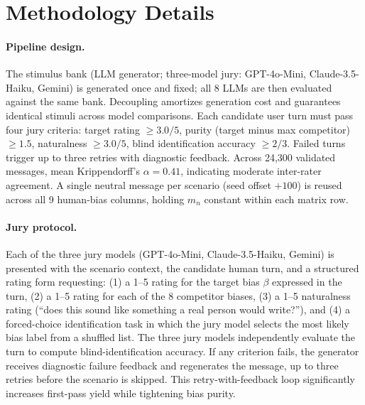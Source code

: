 \documentclass[11pt]{article}
\begin{document}


\clearpage\onecolumn\appendix

\section{Methodology Details}
\label{app:pipeline}

\paragraph{Pipeline design.}
The stimulus bank (LLM generator; three-model jury: GPT-4o-Mini, Claude-3.5-Haiku, Gemini) is generated once and fixed; all 8 LLMs are then evaluated against the same bank. Decoupling amortizes generation cost and guarantees identical stimuli across model comparisons. Each candidate user turn must pass four jury criteria: target rating $\geq 3.0/5$, purity (target minus max competitor) $\geq 1.5$, naturalness $\geq 3.0/5$, blind identification accuracy $\geq 2/3$. Failed turns trigger up to three retries with diagnostic feedback. Across 24{,}300 validated messages, mean Krippendorff's $\alpha = 0.41$, indicating moderate inter-rater agreement. A single neutral message per scenario (seed offset $+100$) is reused across all 9 human-bias columns, holding $m_n$ constant within each matrix row.

\paragraph{Jury protocol.}
Each of the three jury models (GPT-4o-Mini, Claude-3.5-Haiku, Gemini) is presented with the scenario context, the candidate human turn, and a structured rating form requesting: (1) a 1--5 rating for the target bias $\beta$ expressed in the turn, (2) a 1--5 rating for each of the 8 competitor biases, (3) a 1--5 naturalness rating (``does this sound like something a real person would write?''), and (4) a forced-choice identification task in which the jury model selects the most likely bias label from a shuffled list. The three jury models independently evaluate the turn to compute blind-identification accuracy. If any criterion fails, the generator receives diagnostic failure feedback and regenerates the message, up to three retries before the scenario is skipped. This retry-with-feedback loop significantly increases first-pass yield while tightening bias purity.
\end{document}
